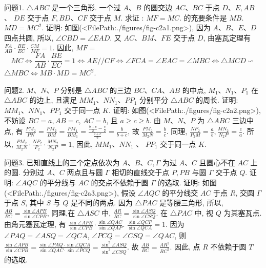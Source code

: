 
问题1. $\triangle A B C$ 是一个三角形.
一个过 $A 、 B$ 的圆交边 $A C 、 B C$ 于点 $D 、 E, A B$ 、 $D E$ 交于点 $F, B D 、 C F$ 交于点 $M$. 求证 : $M F=M C$. 的充要条件是 $M B$. $M D=M C^2$.
证明: 如图(<FilePath:./figures/fig-c2a1.png>), 因为 $A 、 B 、 E 、 D$ 四点共圆, 所以, $\angle C B D=\angle E A D$. 又 $A C 、 B M 、 F E$ 交于点 $D$, 由塞瓦定理有 $\frac{F A}{A B} \cdot \frac{B E}{E C} \cdot \frac{C M}{M F}=1$. 因此, $M F=$
$$
M C \Leftrightarrow \frac{F A}{A B} \cdot \frac{B E}{E C}=1 \Leftrightarrow A E / / C F \Leftrightarrow \angle F C A=\angle E A C=\angle M B C \Leftrightarrow \triangle M C D \backsim
$$
$\triangle M B C \Leftrightarrow M B \cdot M D=M C^2$.



问题2. $M 、 N 、 P$ 分别是 $\triangle A B C$ 的三边 $B C 、 C A 、 A B$ 的中点, $M_1 、 N_1 、 P_1$ 在 $\triangle A B C$ 的边上, 且满足 $M M_1 、 N N_1 、 P P_1$ 分别平分 $\triangle A B C$ 的周长.
证明: $M M_1 、 N N_1 、 P P_1$ 交于同一点 $K$.
证明: 如图(<FilePath:./figures/fig-c2a2.png>),不妨设 $B C=a, A B=c$, $A C=b$, 且 $a \geqslant c \geqslant b$. 由 $M 、 N 、 P$ 为 $\triangle A B C$ 三边中点, 有 $\frac{P M_2}{P N}=\frac{P M_2}{B M}=\frac{P M_1}{B M_1}=\frac{\frac{b+c}{2}-\frac{c}{2}}{\frac{b+c}{2}}= \frac{b}{b+c}$, 故 $\frac{P M_2}{M_2 N}=\frac{b}{c}$. 同理, $\frac{N P_2}{P_2 M}=\frac{a}{b}, \frac{M N_2}{N_2 P}=\frac{c}{a}$.
所以, $\frac{P M_2}{M_2 N} \cdot \frac{N P_2}{P_2} \cdot \frac{M N_2}{N_2 P}=1$, 因此, $M M_1 、 N N_1$ 、 $P P_1$ 交于同一点 $K$.



问题3. 已知直线上的三个定点依次为 $A 、 B 、 C, \Gamma$ 为过 $A 、 C$ 且圆心不在 $A C$ 上的圆.
分别过 $A 、 C$ 两点且与圆 $\Gamma$ 相切的直线交于点 $P, P B$ 与圆 $\Gamma$ 交于点 $Q$. 证明: $\angle A Q C$ 的平分线与 $A C$ 的交点不依赖于圆 $\Gamma$ 的选取.
证明: 如图(<FilePath:./figures/fig-c2a3.png>), 假设 $\angle A Q C$ 的平分线交 $A C$ 于点 $R$, 交圆 $\Gamma$ 于点 $S$, 其中 $S$ 与 $Q$ 是不同的两点.
因为 $\triangle P A C$ 是等腰三角形, 所以, $\frac{A B}{B C}=\frac{\sin \angle A P B}{\sin \angle C P B}$, 同理,在 $\triangle A S C$ 中, $\frac{A R}{R C}=\frac{\sin \angle A S Q}{\sin \angle C S Q}$. 在 $\triangle P A C$ 中, 视 $Q$ 为其塞瓦点.
由角元塞瓦定理, 有 $\frac{\sin \angle A P B}{\sin \angle C P B} \cdot \frac{\sin \angle Q A C}{\sin \angle Q A P}$.
$\frac{\sin \angle Q C P}{\sin \angle Q C A}=1$. 因为 $\angle P A Q=\angle A S Q=\angle Q C A$,
$\angle P C Q=\angle C S Q=\angle Q A C$, 则 $\frac{\sin \angle A P B}{\sin \angle C P B}=\frac{\sin \angle P A Q \cdot \sin \angle Q C A}{\sin \angle Q A C \cdot \sin \angle P C Q}= \frac{\sin ^2 \angle A S Q}{\sin ^2 \angle C S Q}$. 故 $\frac{A B}{B C}=\frac{A R^2}{R C^2}$. 因此, 点 $R$ 不依赖于圆 $T$ 的选取.



